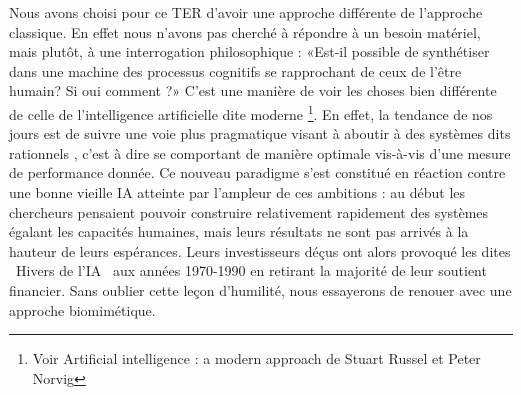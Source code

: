 Nous avons choisi pour ce TER d'avoir une approche différente de l'approche
classique. En effet nous n'avons pas cherché à répondre à un besoin matériel,
mais plutôt, à une interrogation philosophique : «Est-il possible de
synthétiser dans une machine des processus cognitifs se rapprochant de ceux de
l'être humain? Si oui comment ?» C'est une manière de voir les choses bien
différente de celle de l'intelligence artificielle dite \og moderne \fg
\footnote{Voir \og Artificial intelligence : a modern approach \fg de Stuart
Russel et Peter Norvig}. En effet, la tendance de nos jours est de suivre une
voie plus pragmatique visant à aboutir à des systèmes dits \og rationnels \fg,
c'est à dire se comportant de manière optimale vis-à-vis d'une mesure de performance
donnée.
Ce nouveau paradigme s'est constitué en réaction contre une bonne vieille IA
atteinte par l'ampleur de ces ambitions : au début les chercheurs pensaient
pouvoir construire relativement rapidement des systèmes égalant les capacités
humaines, mais leurs résultats ne sont pas arrivés à la hauteur de leurs
espérances. Leurs investisseurs déçus ont alors provoqué les dites
\og{}~Hivers de l'IA~\fg{} aux années 1970-1990 en retirant la majorité de
leur soutient financier.
Sans oublier cette leçon d'humilité, nous essayerons de renouer avec une
approche biomimétique.
